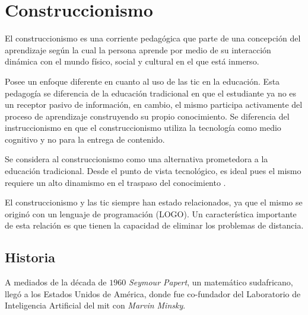 \section{Construccionismo}
\label{sec:tics_CONSTRUCCIONISMO}

El construccionismo es una corriente pedagógica que parte de una concepción del
aprendizaje según la cual la persona aprende por medio de su interacción
dinámica con el mundo físico, social y cultural en el que está
inmerso\cite{valdivia:sg}.

Posee un enfoque diferente en cuanto al uso de las \Gls{tic} en la educación.
Esta pedagogía se diferencia de la educación tradicional en que el estudiante ya
no es un receptor pasivo de información, en cambio, el mismo participa
activamente del proceso de aprendizaje construyendo su propio conocimiento. Se
diferencia del instruccionismo en que el construccionismo utiliza la tecnología
como medio cognitivo y no para la entrega de contenido.

Se considera al construccionismo como una alternativa prometedora a la educación
tradicional. Desde el punto de vista tecnológico, es ideal pues el mismo
requiere un alto dinamismo en el traspaso del conocimiento
\cite{sasha:construtivism}. 

El construccionismo y las \Gls{tic} siempre han estado relacionados, ya que el
mismo se originó con un lenguaje de programación (LOGO)\cite{ict:ttc}. Un
característica importante de esta relación es que tienen la capacidad de
eliminar los problemas de distancia\cite{mariluz:seiousgames}.


\subsection{Historia}

A mediados de la década de $1960$ \textit{Seymour Papert}, un matemático
sudafricano, llegó a los Estados Unidos de América, donde fue co-fundador del
Laboratorio de Inteligencia Artificial del \Gls{mit} con \textit{Marvin
    Minsky}\cite{logo:sg}. 


